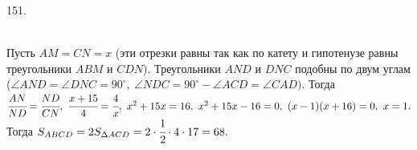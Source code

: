 151. \begin{figure}[ht!]
\end{figure}\\
Пусть $AM=CN=x$ (эти отрезки равны так как по катету и гипотенузе равны треугольники $ABM$ и $CDN$). Треугольники $AND$ и $DNC$ подобны по двум  углам ($\angle AND=\angle DNC=90^\circ,\ \angle NDC=90^\circ-\angle ACD=\angle CAD).$ Тогда $\cfrac{AN}{ND}=\cfrac{ND}{CN},\ \cfrac{x+15}{4}=\cfrac{4}{x},\ x^2+15x=16,\ x^2+15x-16=0,\
(x-1)(x+16)=0,\ x=1.$ Тогда $S_{ABCD}=2S_{\Delta ACD}=2\cdot\cfrac{1}{2}\cdot4\cdot17=68.$\newpage\noindent
